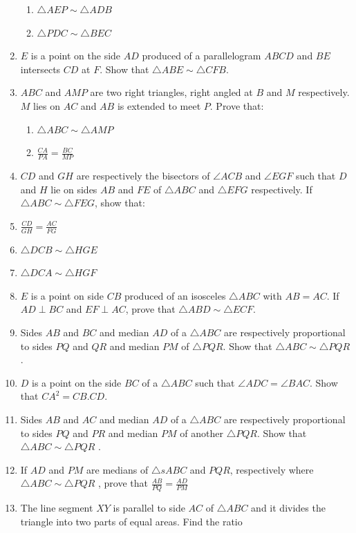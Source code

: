 \begin{enumerate}[label=\arabic*.,ref=\thesubsection.\theenumi]
\begin{enumerate}
\item   $\triangle  AEP  \sim   \triangle  ADB$
 \item  $\triangle  PDC  \sim   \triangle  BEC$
\end{enumerate}
%
\item  $E$ is a point on the side $AD$ produced of a parallelogram $ABCD$ and $BE$ intersects $CD$ at $F$. Show that  $\triangle  ABE  \sim   \triangle  CFB$.
\item  $ABC$ and $AMP$ are two right triangles, right angled at $B$ and $M$ respectively. $M$ lies on $AC$ and $AB$ is extended to meet $P$. Prove that: 
\begin{enumerate}
\item   $\triangle  ABC  \sim   \triangle  AMP$
\item  $\frac{CA}{PA} = \frac{BC}{  MP}$
\end{enumerate}
%
\item  $CD$ and $GH$ are respectively the bisectors of  $\angle  ACB$ and  $\angle  EGF$ such that $D$ and $H$ lie on sides $AB$ and $FE$ of  $\triangle  ABC$ and  $\triangle  EFG$ respectively. If  $\triangle  ABC  \sim   \triangle  FEG$, show that:
\item  $\frac{CD}{GH} = \frac{ AC}{  FG}$
\item  $ \triangle  DCB  \sim   \triangle  HGE$
 \item  $ \triangle  DCA  \sim   \triangle  HGF$
\item  $E$ is a point on side $CB$ produced of an isosceles $\triangle ABC$ with $AB = AC$. If $AD  \perp  BC$ and $EF  \perp  AC$, prove that  $\triangle  ABD  \sim   \triangle  ECF$.
\item  Sides $AB$ and $BC$ and median $AD$ of a $\triangle ABC$ are respectively proportional to sides  $PQ$  and $QR$ and median $PM$ of  $\triangle PQR$. Show that  $\triangle  ABC  \sim  \triangle PQR$ .
\item  $D$ is a point on the side $BC$ of a $\triangle ABC$ such that  $\angle  ADC =  \angle  BAC$. Show that $CA^2 = CB.CD$.
\item  Sides $AB$ and $AC$ and median $AD$ of a $\triangle ABC$ are respectively proportional to sides $PQ$ and $PR$ and median $PM$ of another $\triangle PQR$. Show that  $\triangle  ABC  \sim   \triangle PQR$ .%
\item  If $AD$ and $PM$ are medians of $\triangle s ABC$ and $PQR$, respectively where  $\triangle  ABC  \sim   \triangle PQR$ , prove that
$\frac{AB}{ PQ} = \frac{AD}{  PM}$
\item The line segment $XY$ is parallel to side $AC$ of  $\triangle  ABC$ and it divides the triangle into two parts of equal areas. Find the ratio

\end{enumerate}
